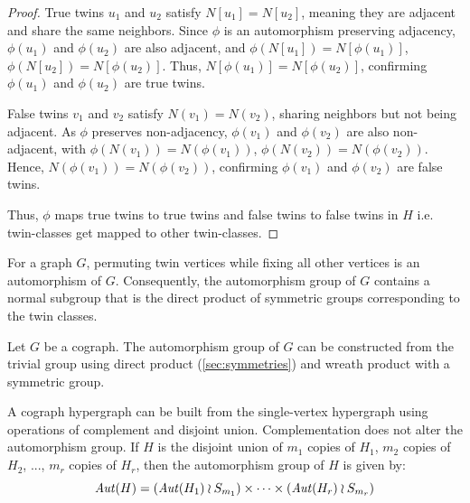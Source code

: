 \begin{proof}
True twins $u_1$ and $u_2$ satisfy $N[u_1]=N[u_2]$, meaning they are adjacent and share the same neighbors. Since $\phi$ is an automorphism preserving adjacency, $\phi(u_1)$ and $\phi(u_2)$ are also adjacent, and $\phi(N[u_1])=N[\phi(u_1)]$, $\phi(N[u_2])=N[\phi(u_2)]$. Thus, $N[\phi(u_1)]=N[\phi(u_2)]$, confirming $\phi(u_1)$ and $\phi(u_2)$ are true twins.

False twins $v_1$ and $v_2$ satisfy $N(v_1)=N(v_2)$, sharing neighbors but not being adjacent. As $\phi$ preserves non-adjacency, $\phi(v_1)$ and $\phi(v_2)$ are also non-adjacent, with $\phi(N(v_1))=N(\phi(v_1))$, $\phi(N(v_2))=N(\phi(v_2))$. Hence, $N(\phi(v_1))=N(\phi(v_2))$, confirming $\phi(v_1)$ and $\phi(v_2)$ are false twins.

Thus, $\phi$ maps true twins to true twins and false twins to false twins in $H$ i.e. twin-classes get mapped to other twin-classes.
\end{proof}

For a graph $G$, permuting twin vertices while fixing all other vertices is an automorphism of $G$. Consequently, the automorphism group of $G$ contains a normal subgroup that is the direct product of symmetric groups corresponding to the twin classes.

\begin{proposition}\label{prop:cameron}
Let $G$ be a cograph. The automorphism group of $G$ can be constructed from the trivial group using direct product (\ref{sec:symmetries}) and wreath product with a symmetric group. \cite{Cam22}
\end{proposition}

A cograph hypergraph can be built from the single-vertex hypergraph using operations of complement and disjoint union. Complementation does not alter the automorphism group. If $H$ is the disjoint union of $m_1$ copies of $H_1$, $m_2$ copies of $H_2$, ..., $m_r$ copies of $H_r$,  then the automorphism group of $H$ is given by:
\[
\mathit{Aut}(H)=(\mathit{Aut}(H_1)\wr S_{m_1})\times\dots\times(\mathit{Aut}(H_r)\wr S_{m_r})
\]
